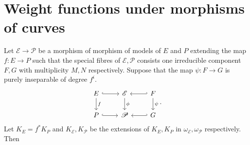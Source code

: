 \section{Weight functions under morphisms of curves} \label{sec:weight_functions_under_morphisms_of_curves}

\begin{lemma}
	Let $\mathscr{E} \to \mathscr{P}$ be a morphism of morphism of models of $E$ and $P$ extending the map $f: E \to P$ such that the special fibres of $\mathscr E, \mathscr P$ consists one irreducible component $F, G$ with multiplicity $M, N$ respectively. 
	Suppose that the map $\psi: F \to G$ is purely inseparable of degree $f^{i}$.
	\[
	\begin{tikzcd}
		E \dar{f} \rar[hookrightarrow] & \mathscr E \dar{\phi} \rar[hookleftarrow] &  F \dar{\psi} \\
		P \rar[hookrightarrow] & \mathscr P \rar[hookleftarrow] &  G
	\end{tikzcd}
	.\] 
	Let $K_E = f^* K_P$ and $K_{\mathscr E}, K_{\mathscr P}$ be the extensions of $K_E, K_P$ in $\omega_\mathscr E, \omega_\mathscr P$ respectively. 
	Then 
\end{lemma}
